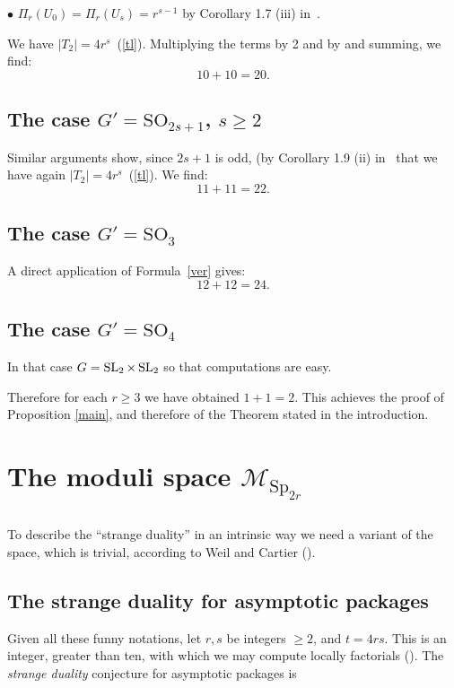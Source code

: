 \documentclass{amsart}
\numberwithin{equation}{section}
\theoremstyle{plain}
\theoremstyle{remark}
\begin{document}
 $\bullet$ $\Pi_r(U_0)=\Pi_r(U_s)=r^{s-1}$ by Corollary 1.7
(iii) in~\cite{O-W}.


We have  $|T_2 |=4r^s$~(\ref{tl}). Multiplying the terms by 2 and  by
and summing, we find:
$$10+10=20.$$

\subsection{The case $G'= \mathrm{SO}_{2s+1}$, $s\ge 2$}
Similar arguments show, since $2s+1$ is odd, 
(by Corollary 1.9 (ii) in~\cite{O-W}
that we have again $|T_2 |=4r^s$~(\ref{tl}). We find:
$$11+11=22.$$

\subsection{The case $G'=\mathrm{SO}_3$}
A direct application of Formula~\eqref{ver} gives:
$$12+12=24. $$

\subsection{The case $G'=\mathrm{SO}_4$}
In that case $G=\operatorname{SL}_2\times \operatorname{SL}_2$ so that computations are easy.


Therefore for each $r\ge 3$ we have obtained $1+1=2$. This
achieves the proof of Proposition \ref{main}, and therefore of the Theorem stated
in the introduction.


\section{The moduli space $\mathcal{M}_{\mathrm{Sp}_{2r}}$}\label{S4}


\subsection{}


To describe the ``strange duality'' in an intrinsic way we need a variant of
the space, which is trivial, according to 
 Weil  and Cartier (\cite[\S7]{L-S}).


\subsection{The strange duality for asymptotic packages}
Given all these funny notations, 
let $r,s$ be integers $\ge 2$,
and $t=4rs$.  This is an integer, greater than ten, with which we may compute
locally factorials (\cite[Thm. 1.2]{S}). 
The \textsl{strange
duality} conjecture for asymptotic packages is
\end{document}
